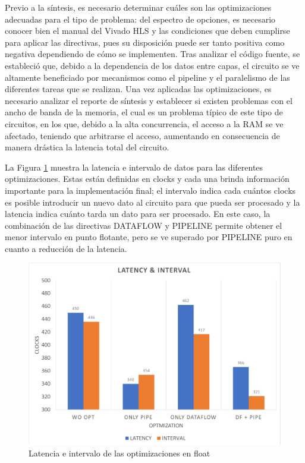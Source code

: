Previo a la síntesis, es necesario determinar cuáles son las optimizaciones adecuadas para el tipo de problema: del espectro de opciones, es necesario conocer bien el manual del Vivado HLS y las condiciones que deben cumplirse para aplicar las directivas, pues su disposición puede ser tanto positiva como negativa dependiendo de cómo se implementen. Tras analizar el código fuente, se estableció que, debido a la dependencia de los datos entre capas, el circuito se ve altamente beneficiado por mecanismos como el pipeline y el paralelismo de las diferentes tareas que se realizan. Una vez aplicadas las optimizaciones, es necesario analizar el reporte de síntesis y establecer si existen problemas con el ancho de banda de la memoria, el cual es un problema típico de este tipo de circuitos, en los que, debido a la alta concurrencia, el acceso a la RAM se ve afectado, teniendo que arbitrarse el acceso, aumentando en consecuencia de manera drástica la latencia total del circuito.

La Figura \ref{fig:latIntFloat} muestra la latencia e intervalo de datos para las diferentes optimizaciones. Estas están definidas en clocks y cada una brinda información importante para la implementación final; el intervalo indica cada cuántos clocks es posible introducir un nuevo dato al circuito para que pueda ser procesado y la latencia indica cuánto tarda un dato para ser procesado. En este caso, la combinación de las directivas DATAFLOW y PIPELINE permite obtener el menor intervalo en punto flotante, pero se ve superado por PIPELINE puro en cuanto a reducción de la latencia.

\begin{figure}[!ht]
	\centering
		\includegraphics[scale=0.45]{Figures/LATINTFLOAT}
	\caption{Latencia e intervalo de las optimizaciones en float}
	\label{fig:latIntFloat}
\end{figure}

